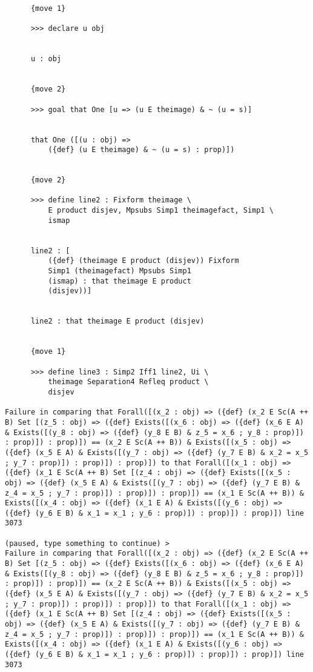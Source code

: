 \documentclass[12pt]{article}
\begin{document}
\begin{verbatim}
      {move 1}

      >>> declare u obj


      u : obj


      {move 2}

      >>> goal that One [u => (u E theimage) & ~ (u = s)]


      that One ([(u : obj) => 
          ({def} (u E theimage) & ~ (u = s) : prop)])


      {move 2}

      >>> define line2 : Fixform theimage \
          E product disjev, Mpsubs Simp1 theimagefact, Simp1 \
          ismap


      line2 : [
          ({def} (theimage E product (disjev)) Fixform 
          Simp1 (theimagefact) Mpsubs Simp1 
          (ismap) : that theimage E product 
          (disjev))]


      line2 : that theimage E product (disjev)


      {move 1}

      >>> define line3 : Simp2 Iff1 line2, Ui \
          theimage Separation4 Refleq product \
          disjev

Failure in comparing that Forall([(x_2 : obj) => ({def} (x_2 E Sc(A ++ B) Set [(z_5 : obj) => ({def} Exists([(x_6 : obj) => ({def} (x_6 E A) & Exists([(y_8 : obj) => ({def} (y_8 E B) & z_5 = x_6 ; y_8 : prop)]) : prop)]) : prop)]) == (x_2 E Sc(A ++ B)) & Exists([(x_5 : obj) => ({def} (x_5 E A) & Exists([(y_7 : obj) => ({def} (y_7 E B) & x_2 = x_5 ; y_7 : prop)]) : prop)]) : prop)]) to that Forall([(x_1 : obj) => ({def} (x_1 E Sc(A ++ B) Set [(z_4 : obj) => ({def} Exists([(x_5 : obj) => ({def} (x_5 E A) & Exists([(y_7 : obj) => ({def} (y_7 E B) & z_4 = x_5 ; y_7 : prop)]) : prop)]) : prop)]) == (x_1 E Sc(A ++ B)) & Exists([(x_4 : obj) => ({def} (x_1 E A) & Exists([(y_6 : obj) => ({def} (y_6 E B) & x_1 = x_1 ; y_6 : prop)]) : prop)]) : prop)]) line 3073

(paused, type something to continue) >
Failure in comparing that Forall([(x_2 : obj) => ({def} (x_2 E Sc(A ++ B) Set [(z_5 : obj) => ({def} Exists([(x_6 : obj) => ({def} (x_6 E A) & Exists([(y_8 : obj) => ({def} (y_8 E B) & z_5 = x_6 ; y_8 : prop)]) : prop)]) : prop)]) == (x_2 E Sc(A ++ B)) & Exists([(x_5 : obj) => ({def} (x_5 E A) & Exists([(y_7 : obj) => ({def} (y_7 E B) & x_2 = x_5 ; y_7 : prop)]) : prop)]) : prop)]) to that Forall([(x_1 : obj) => ({def} (x_1 E Sc(A ++ B) Set [(z_4 : obj) => ({def} Exists([(x_5 : obj) => ({def} (x_5 E A) & Exists([(y_7 : obj) => ({def} (y_7 E B) & z_4 = x_5 ; y_7 : prop)]) : prop)]) : prop)]) == (x_1 E Sc(A ++ B)) & Exists([(x_4 : obj) => ({def} (x_1 E A) & Exists([(y_6 : obj) => ({def} (y_6 E B) & x_1 = x_1 ; y_6 : prop)]) : prop)]) : prop)]) line 3073


\end{verbatim}
\end{document}
